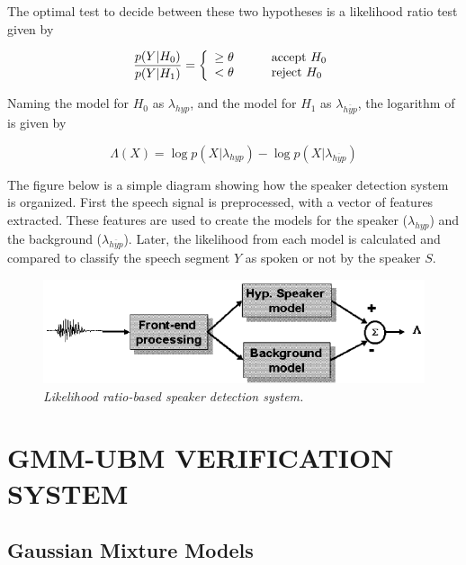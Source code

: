 \documentclass[a4paper,twocolumn]{article}
\begin{document}
\noindent The optimal test to decide between these two hypotheses is a likelihood ratio test given by

\begin{equation}
    \label{eq:likelihood_ratio_test}
    \frac{p(Y|H_0)}{p(Y|H_1)} = \left\{
        \begin{array}{l l}
        \geq \theta \quad\quad\quad \text{accept $H_0$}\\
        < \theta \quad\quad\quad \text{reject $H_0$}
        \end{array} \right.
\end{equation}

\noindent Naming the model for $H_0$ as $\lambda_{hyp}$, and the model for $H_1$ as $\lambda_{\overline{hyp}}$, the logarithm of  is given by

\begin{equation}
    \label{eq:log_likelihood_ratio_test}
    \Lambda(X) = \log p(X|\lambda_{hyp}) - \log p(X|\lambda_{\overline{hyp}})
\end{equation}

The figure below is a simple diagram showing how the speaker detection system is organized. First the speech signal is preprocessed, with a vector of features extracted. These features are used to create the models for the speaker ($\lambda_{hyp}$) and the background ($\lambda_{\overline{hyp}}$). Later, the likelihood from each model is calculated and compared to classify the speech segment $Y$ as spoken or not by the speaker $S$.

\begin{figure}[h]
    \label{fig:speaker_detection_system}
    \centering
    \includegraphics[scale=0.3]{speaker-detection-system}
    \caption{\textit{Likelihood ratio-based speaker detection system.}}
\end{figure}


\section{GMM-UBM VERIFICATION SYSTEM}

\subsection{Gaussian Mixture Models}
\end{document}
